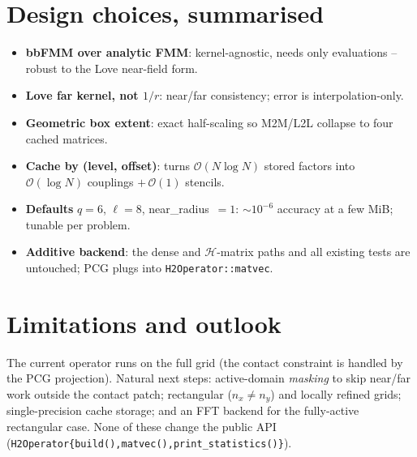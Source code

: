 \documentclass[11pt,a4paper]{article}
\newcommand{\Order}{\mathcal{O}}
\begin{document}
\section{Design choices, summarised}
\begin{itemize}
\item \textbf{bbFMM over analytic FMM}: kernel-agnostic, needs only
evaluations -- robust to the Love near-field form.
\item \textbf{Love far kernel, not $1/r$}: near/far consistency; error is
interpolation-only.
\item \textbf{Geometric box extent}: exact half-scaling so M2M/L2L collapse
to four cached matrices.
\item \textbf{Cache by (level, offset)}: turns $\Order(N\log N)$ stored
factors into $\Order(\log N)$ couplings $+\,\Order(1)$ stencils.
\item \textbf{Defaults} $q=6$, $\ell=8$, near\_radius~$=1$: $\sim10^{-6}$
accuracy at a few MiB; tunable per problem.
\item \textbf{Additive backend}: the dense and $\mathcal{H}$-matrix paths and
all existing tests are untouched; PCG plugs into \texttt{H2Operator::matvec}.
\end{itemize}

\section{Limitations and outlook}
The current operator runs on the full grid (the contact constraint is
handled by the PCG projection). Natural next steps: active-domain
\emph{masking} to skip near/far work outside the contact patch; rectangular
($n_x\neq n_y$) and locally refined grids; single-precision cache storage;
and an FFT backend for the fully-active rectangular case. None of these
change the public API
(\texttt{H2Operator\{build(),matvec(),print\_statistics()\}}).



\end{document}
